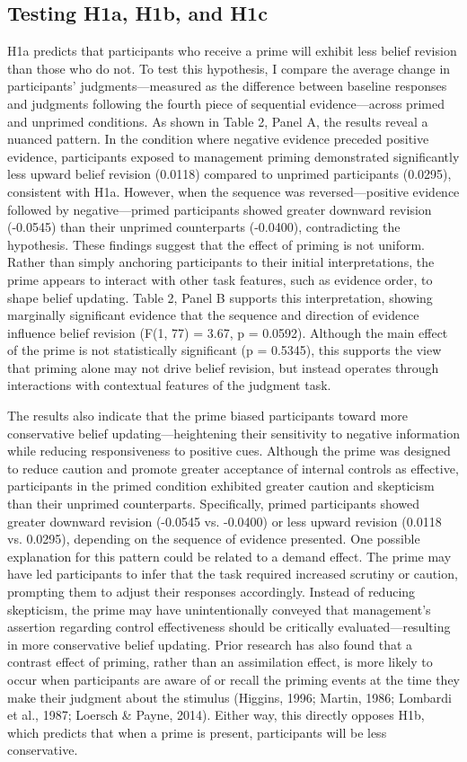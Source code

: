 \documentclass[12pt,english]{article}
\begin{document}
\subsection{Testing H1a, H1b, and H1c}
H1a predicts that participants who receive a prime will exhibit less belief revision than those who do not. To test this hypothesis, I compare the average change in participants’ judgments—measured as the difference between baseline responses and judgments following the fourth piece of sequential evidence—across primed and unprimed conditions. As shown in Table 2, Panel A, the results reveal a nuanced pattern. In the condition where negative evidence preceded positive evidence, participants exposed to management priming demonstrated significantly less upward belief revision (0.0118) compared to unprimed participants (0.0295), consistent with H1a. However, when the sequence was reversed—positive evidence followed by negative—primed participants showed greater downward revision (-0.0545) than their unprimed counterparts (-0.0400), contradicting the hypothesis. These findings suggest that the effect of priming is not uniform. Rather than simply anchoring participants to their initial interpretations, the prime appears to interact with other task features, such as evidence order, to shape belief updating. Table 2, Panel B supports this interpretation, showing marginally significant evidence that the sequence and direction of evidence influence belief revision (F(1, 77) = 3.67, p = 0.0592). Although the main effect of the prime is not statistically significant (p = 0.5345), this supports the view that priming alone may not drive belief revision, but instead operates through interactions with contextual features of the judgment task.

The results also indicate that the prime biased participants toward more conservative belief updating—heightening their sensitivity to negative information while reducing responsiveness to positive cues. Although the prime was designed to reduce caution and promote greater acceptance of internal controls as effective, participants in the primed condition exhibited greater caution and skepticism than their unprimed counterparts. Specifically, primed participants showed greater downward revision (-0.0545 vs. -0.0400) or less upward revision (0.0118 vs. 0.0295), depending on the sequence of evidence presented. One possible explanation for this pattern could be related to a demand effect. The prime may have led participants to infer that the task required increased scrutiny or caution, prompting them to adjust their responses accordingly. Instead of reducing skepticism, the prime may have unintentionally conveyed that management’s assertion regarding control effectiveness should be critically evaluated—resulting in more conservative belief updating. Prior research has also found that a contrast effect of priming, rather than an assimilation effect, is more likely to occur when participants are aware of or recall the priming events at the time they make their judgment about the stimulus (Higgins, 1996; Martin, 1986; Lombardi et al., 1987; Loersch & Payne, 2014). Either way, this directly opposes H1b, which predicts that when a prime is present, participants will be less conservative. 
\end{document}
